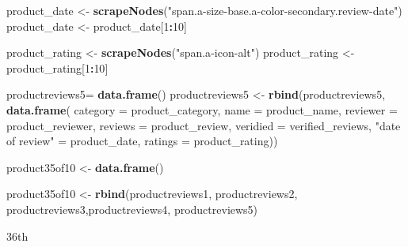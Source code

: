 \documentclass[
]{article}
\newenvironment{Shaded}{\begin{snugshade}}{\end{snugshade}}
\newcommand{\AttributeTok}[1]{\textcolor[rgb]{0.13,0.29,0.53}{#1}}
\newcommand{\DecValTok}[1]{\textcolor[rgb]{0.00,0.00,0.81}{#1}}
\newcommand{\FunctionTok}[1]{\textcolor[rgb]{0.13,0.29,0.53}{\textbf{#1}}}
\newcommand{\NormalTok}[1]{#1}
\newcommand{\OtherTok}[1]{\textcolor[rgb]{0.56,0.35,0.01}{#1}}
\newcommand{\SpecialCharTok}[1]{\textcolor[rgb]{0.81,0.36,0.00}{\textbf{#1}}}
\newcommand{\StringTok}[1]{\textcolor[rgb]{0.31,0.60,0.02}{#1}}
\begin{document}
\begin{Shaded}
\begin{Highlighting}[]
\NormalTok{  product\_date }\OtherTok{\textless{}{-}} \FunctionTok{scrapeNodes}\NormalTok{(}\StringTok{"span.a{-}size{-}base.a{-}color{-}secondary.review{-}date"}\NormalTok{)}
\NormalTok{  product\_date }\OtherTok{\textless{}{-}}\NormalTok{ product\_date[}\DecValTok{1}\SpecialCharTok{:}\DecValTok{10}\NormalTok{]}
  
\NormalTok{  product\_rating }\OtherTok{\textless{}{-}} \FunctionTok{scrapeNodes}\NormalTok{(}\StringTok{"span.a{-}icon{-}alt"}\NormalTok{)}
\NormalTok{  product\_rating }\OtherTok{\textless{}{-}}\NormalTok{ product\_rating[}\DecValTok{1}\SpecialCharTok{:}\DecValTok{10}\NormalTok{]}
  
\NormalTok{  productreviews5}\OtherTok{=} \FunctionTok{data.frame}\NormalTok{()}
\NormalTok{  productreviews5 }\OtherTok{\textless{}{-}} \FunctionTok{rbind}\NormalTok{(productreviews5, }\FunctionTok{data.frame}\NormalTok{(}
                      \AttributeTok{category =}\NormalTok{ product\_category,}
                      \AttributeTok{name =}\NormalTok{ product\_name,}
                      \AttributeTok{reviewer =}\NormalTok{ product\_reviewer,}
                      \AttributeTok{reviews =}\NormalTok{ product\_review,}
                      \AttributeTok{veridied =}\NormalTok{ verified\_reviews,}
                      \StringTok{"date of review"} \OtherTok{=}\NormalTok{ product\_date,}
                      \AttributeTok{ratings =}\NormalTok{ product\_rating))}
  
\NormalTok{  product35of10 }\OtherTok{\textless{}{-}} \FunctionTok{data.frame}\NormalTok{()}
  
\NormalTok{  product35of10 }\OtherTok{\textless{}{-}} \FunctionTok{rbind}\NormalTok{(productreviews1, productreviews2, productreviews3,productreviews4, productreviews5)}
\end{Highlighting}
\end{Shaded}

36th
\end{document}
